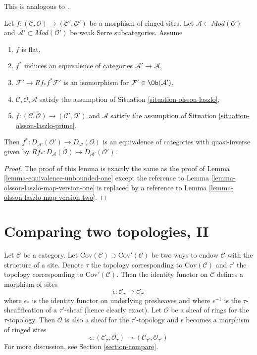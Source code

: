 \begin{lemma}
\label{lemma-equivalence-unbounded-two}
\begin{reference}
This is analogous to \cite[Theorem 2.2.3]{six-I}.
\end{reference}
Let $f : (\mathcal{C}, \mathcal{O}) \to (\mathcal{C}', \mathcal{O}')$
be a morphism of ringed sites.
Let $\mathcal{A} \subset \textit{Mod}(\mathcal{O})$
and $\mathcal{A}' \subset \textit{Mod}(\mathcal{O}')$
be weak Serre subcategories. Assume
\begin{enumerate}
\item $f$ is flat,
\item $f^*$ induces an equivalence of categories
$\mathcal{A}' \to \mathcal{A}$,
\item $\mathcal{F}' \to Rf_*f^*\mathcal{F}'$ is an isomorphism
for $\mathcal{F}' \in \Ob(\mathcal{A}')$,
\item $\mathcal{C}, \mathcal{O}, \mathcal{A}$ satisfy the
assumption of Situation \ref{situation-olsson-laszlo},
\item $f : (\mathcal{C}, \mathcal{O}) \to (\mathcal{C}', \mathcal{O}')$
and $\mathcal{A}$ satisfy the assumption of
Situation \ref{situation-olsson-laszlo-prime}.
\end{enumerate}
Then $f^* : D_{\mathcal{A}'}(\mathcal{O}') \to D_\mathcal{A}(\mathcal{O})$
is an equivalence of categories with quasi-inverse given by
$Rf_* : D_\mathcal{A}(\mathcal{O}) \to D_{\mathcal{A}'}(\mathcal{O}')$.
\end{lemma}

\begin{proof}
The proof of this lemma is exactly the same as the proof
of Lemma \ref{lemma-equivalence-unbounded-one}
except the reference to Lemma \ref{lemma-olsson-laszlo-map-version-one}
is replaced by a reference to
Lemma \ref{lemma-olsson-laszlo-map-version-two}.
\end{proof}








\section{Comparing two topologies, II}
\label{section-compare-II}

\noindent
Let $\mathcal{C}$ be a category. Let
$\text{Cov}(\mathcal{C}) \supset \text{Cov}'(\mathcal{C})$
be two ways to endow $\mathcal{C}$ with the structure of a site.
Denote $\tau$ the topology corresponding to $\text{Cov}(\mathcal{C})$
and $\tau'$ the topology corresponding to $\text{Cov}'(\mathcal{C})$.
Then the identity functor on $\mathcal{C}$ defines a morphism
of sites
$$
\epsilon : \mathcal{C}_\tau \longrightarrow \mathcal{C}_{\tau'}
$$
where $\epsilon_*$ is the identity functor on underlying presheaves and
where $\epsilon^{-1}$ is the $\tau$-sheafification of a $\tau'$-sheaf
(hence clearly exact). Let $\mathcal{O}$ be a sheaf of rings for the
$\tau$-topology. Then $\mathcal{O}$ is also a sheaf for the $\tau'$-topology
and $\epsilon$ becomes a morphism of ringed sites
$$
\epsilon :
(\mathcal{C}_\tau, \mathcal{O}_\tau)
\longrightarrow
(\mathcal{C}_{\tau'}, \mathcal{O}_{\tau'})
$$
For more discussion, see Section \ref{section-compare}.

